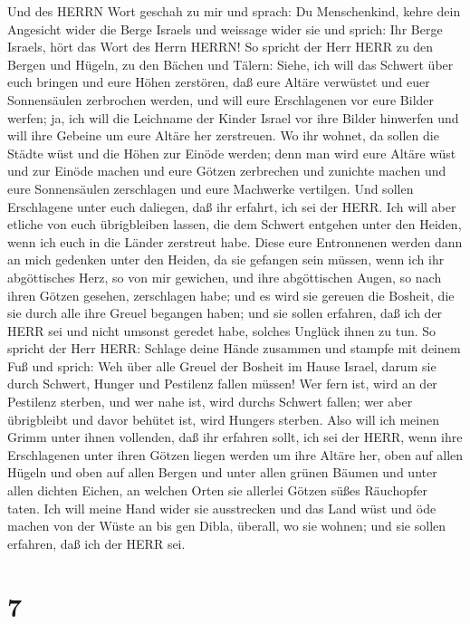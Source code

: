  Und des HERRN Wort geschah zu mir und sprach: 
Du Menschenkind, kehre dein Angesicht wider die Berge Israels und
weissage wider sie  und sprich: Ihr Berge Israels, hört das
Wort des Herrn HERRN! So spricht der Herr HERR zu den Bergen und Hügeln,
zu den Bächen und Tälern: Siehe, ich will das Schwert über euch bringen
und eure Höhen zerstören,  daß eure Altäre verwüstet und
euer Sonnensäulen zerbrochen werden, und will eure Erschlagenen vor eure
Bilder werfen;  ja, ich will die Leichname der Kinder Israel
vor ihre Bilder hinwerfen und will ihre Gebeine um eure Altäre her
zerstreuen.  Wo ihr wohnet, da sollen die Städte wüst und
die Höhen zur Einöde werden; denn man wird eure Altäre wüst und zur
Einöde machen und eure Götzen zerbrechen und zunichte machen und eure
Sonnensäulen zerschlagen und eure Machwerke vertilgen.  Und
sollen Erschlagene unter euch daliegen, daß ihr erfahrt, ich sei der
HERR.  Ich will aber etliche von euch übrigbleiben lassen,
die dem Schwert entgehen unter den Heiden, wenn ich euch in die Länder
zerstreut habe.  Diese eure Entronnenen werden dann an mich
gedenken unter den Heiden, da sie gefangen sein müssen, wenn ich ihr
abgöttisches Herz, so von mir gewichen, und ihre abgöttischen Augen, so
nach ihren Götzen gesehen, zerschlagen habe; und es wird sie gereuen die
Bosheit, die sie durch alle ihre Greuel begangen haben; 
und sie sollen erfahren, daß ich der HERR sei und nicht umsonst geredet
habe, solches Unglück ihnen zu tun.  So spricht der Herr
HERR: Schlage deine Hände zusammen und stampfe mit deinem Fuß und
sprich: Weh über alle Greuel der Bosheit im Hause Israel, darum sie
durch Schwert, Hunger und Pestilenz fallen müssen!  Wer
fern ist, wird an der Pestilenz sterben, und wer nahe ist, wird durchs
Schwert fallen; wer aber übrigbleibt und davor behütet ist, wird Hungers
sterben. Also will ich meinen Grimm unter ihnen vollenden, 
daß ihr erfahren sollt, ich sei der HERR, wenn ihre Erschlagenen unter
ihren Götzen liegen werden um ihre Altäre her, oben auf allen Hügeln und
oben auf allen Bergen und unter allen grünen Bäumen und unter allen
dichten Eichen, an welchen Orten sie allerlei Götzen süßes Räuchopfer
taten.  Ich will meine Hand wider sie ausstrecken und das
Land wüst und öde machen von der Wüste an bis gen Dibla, überall, wo sie
wohnen; und sie sollen erfahren, daß ich der HERR sei.

\hypertarget{section-6}{%
\section{7}\label{section-6}}

